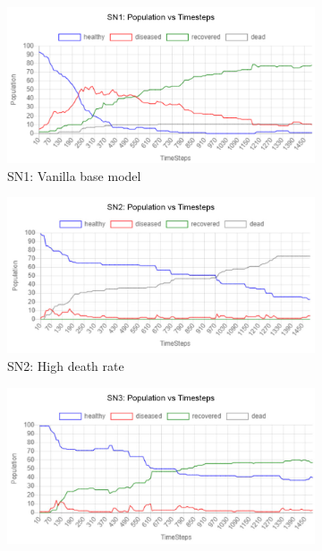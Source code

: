 \documentclass[a4paper,11pt]{article}
\begin{document}
    \begin{figure}[H]
        \centering
        \begin{subfigure}[b]{0.49\linewidth}
            \includegraphics[width=\linewidth]{pop_graphs/SN1_pop.png}
            \caption{SN1: Vanilla base model}
            \label{fig:SN1}
        \end{subfigure}
        \begin{subfigure}[b]{0.49\linewidth}
            \includegraphics[width=\linewidth]{pop_graphs/SN2_pop.png}
            \caption{SN2: High death rate}
            \label{fig:SN2}
        \end{subfigure}
        \begin{subfigure}[b]{0.49\linewidth}
            \includegraphics[width=\linewidth]{pop_graphs/SN3_pop.jpg}

\end{subfigure}
\end{figure}
\end{document}
